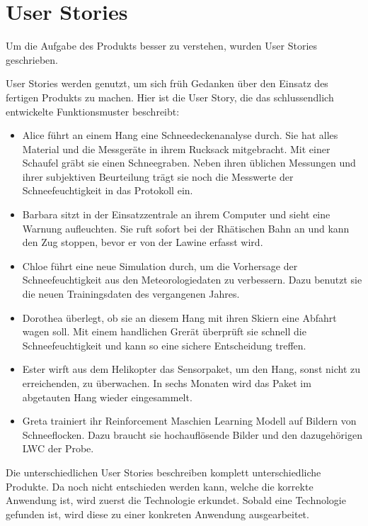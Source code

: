 \section{User Stories}

Um die Aufgabe des Produkts besser zu verstehen, wurden User Stories geschrieben.

User Stories werden genutzt, um sich früh Gedanken über den Einsatz des fertigen Produkts zu machen. Hier ist die User Story, die das schlussendlich entwickelte Funktionsmuster beschreibt:

\begin{itemize}

\item Alice führt an einem Hang eine Schneedeckenanalyse durch. Sie hat alles Material und die Messgeräte in ihrem Rucksack mitgebracht. Mit einer Schaufel gräbt sie einen Schneegraben. Neben ihren üblichen Messungen und ihrer subjektiven Beurteilung trägt sie noch die Messwerte der Schneefeuchtigkeit in das Protokoll ein.

\item Barbara sitzt in der Einsatzzentrale an ihrem Computer und sieht eine Warnung aufleuchten. Sie ruft sofort bei der Rhätischen Bahn an und kann den Zug stoppen, bevor er von der Lawine erfasst wird.

\item Chloe führt eine neue Simulation durch, um die Vorhersage der Schneefeuchtigkeit aus den Meteorologiedaten zu verbessern. Dazu benutzt sie die neuen Trainingsdaten des vergangenen Jahres.

\item Dorothea überlegt, ob sie an diesem Hang mit ihren Skiern eine Abfahrt wagen soll. Mit einem handlichen Grerät überprüft sie schnell die Schneefeuchtigkeit und kann so eine sichere Entscheidung treffen.

\item Ester wirft aus dem Helikopter das Sensorpaket, um den Hang, sonst nicht zu erreichenden, zu überwachen. In sechs Monaten wird das Paket im abgetauten Hang wieder eingesammelt.

\item Greta trainiert ihr Reinforcement Maschien Learning Modell auf Bildern von Schneeflocken. Dazu braucht sie hochauflösende Bilder und den dazugehörigen LWC der Probe.

\end{itemize}

Die unterschiedlichen User Stories beschreiben komplett unterschiedliche Produkte. Da noch nicht entschieden werden kann, welche die korrekte Anwendung ist, wird zuerst die Technologie erkundet. Sobald eine Technologie gefunden ist, wird diese zu einer konkreten Anwendung ausgearbeitet.

